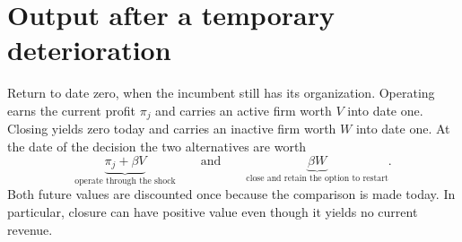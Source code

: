 \documentclass[11pt,letterpaper]{article}
\begin{document}
\section{Output after a temporary deterioration}\label{sec:impact}
Return to date zero, when the incumbent still has its organization. Operating earns the current profit $\pi_j$ and carries an active firm worth $V$ into date one. Closing yields zero today and carries an inactive firm worth $W$ into date one. At the date of the decision the two alternatives are worth
\[
 \underbrace{\pi_j+\beta V}_{\text{operate through the shock}}
 \qquad\text{and}\qquad
 \underbrace{\beta W}_{\text{close and retain the option to restart}} .
\]
Both future values are discounted once because the comparison is made today. In particular, closure can have positive value even though it yields no current revenue.
\end{document}
